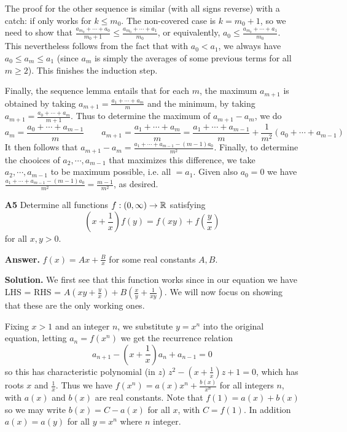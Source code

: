 \documentclass[11pt,a4paper]{article}
\begin{document}
\begin{enumerate}
    The proof for the other sequence is similar (with all signs reverse) with a catch: if only works for $k\le m_0$. 
    The non-covered case is $k=m_0 + 1$, so we need to show that 
    $\frac{a_{m_0} + \cdots + a_{0}}{m_0 + 1}\le \frac{a_{m_0} + \cdots + a_{1}}{m_0}$, 
    or equivalently, $a_0\le \frac{a_{m_0} + \cdots + a_{1}}{m_0}$. 
    This nevertheless follows from the fact that with $a_0<a_1$, we always have $a_0\le a_m\le a_1$ 
    (since $a_m$ is simply the averages of some previous terms for all $m\ge 2$). 
    This finishes the induction step. 
    
    Finally, the sequence lemma entails that for each $m$, 
    the maximum $a_{m+1}$ is obtained by taking $a_{m+1}=\frac{a_1+\cdots + a_m}{m}$ 
    and the minimum, by taking $a_{m+1}=\frac{a_0+\cdots + a_m}{m+1}$. 
    Thus to determine the maximum of $a_{m+1}-a_m$, 
    we do 
    \begin{equation}
    	a_m = \frac{a_0+\cdots + a_{m-1}}{m}
    	\qquad 
    	a_{m+1} = \frac{a_1+\cdots + a_m}{m} = \frac{a_1+\cdots + a_{m-1}}{m} + \frac{1}{m^2}(a_0+\cdots + a_{m-1})
    \end{equation}
    It then follows that $a_{m+1}-a_m = \frac{a_1+\cdots + a_{m-1} - (m-1)a_0}{m^2}$. 
    Finally, to determine the chooices of $a_2, \cdots, a_{m-1}$ that maximizes this difference, 
    we take $a_2, \cdots, a_{m-1}$ to be maximum possible, 
    i.e. all $=a_1$. 
    Given also $a_0=0$ we have $\frac{a_1+\cdots + a_{m-1} - (m-1)a_0}{m^2}=\frac{m-1}{m^2}$, 
    as desired. 
    
    \item[\textbf{A5}] Determine all functions $f: (0, \infty)\to{\mathbb R}$ satisfying 
    \[
    \left(x + \frac 1x\right) f(y) = f(xy) + f(\frac{y}{x})
    \]
    for all $x, y > 0$. 
    
    \textbf{Answer.} $f(x) = Ax + \frac{B}{x}$ for some real constants $A, B$. 
    
    \textbf{Solution.} We first see that this function works since in our equation we have LHS = RHS = 
    $A(xy + \frac{y}{x}) + B(\frac{x}{y} + \frac{1}{xy})$. 
    We will now focus on showing that these are the only working ones. 
    
    Fixing $x > 1$ and an integer $n$, we substitute $y = x^n$ into the original equation, 
    letting $a_n = f(x^n)$ we get the recurrence relation 
    \[
    a_{n+1} - (x + \frac{1}{x})a_n + a_{n - 1} = 0
    \]
    so this has characteristic polynomial (in $z$) 
    $z^2 - (x + \frac{1}{x})z + 1 = 0$, 
    which has roots $x$ and $\frac{1}{x}$. 
    Thus we have $f(x^n) = a(x) x^n + \frac{b(x)}{x^n}$ for all integers $n$, 
    with $a(x)$ and $b(x)$ are real constants. 
    Note that $f(1) = a(x)+b(x)$ so we may write $b(x)=C-a(x)$ for all $x$, with $C = f(1)$. 
    In addition $a(x) = a(y)$ for all $y=x^n$ where $n$ integer. 
    

\end{enumerate}
\end{document}
